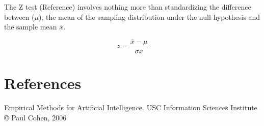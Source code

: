 \documentclass[12pt]{article}
\begin{document}
The Z test (Reference) involves nothing more than standardizing the difference between ($\mu$), the mean of the sampling distribution under the null hypothesis and the sample mean $\overline{x}$.

\[z = \frac{\overline{x} - \mu}{\sigma\overline{x}}\]

\newpage
 

\section*{References}
 Empirical Methods for Artificial Intelligence. 
USC Information Sciences Institute
© Paul Cohen, 2006
\\
\end{document}
